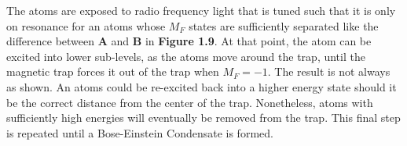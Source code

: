 The atoms are exposed to radio frequency light that is tuned such that it is only on resonance for an atoms whose $M_F$ states are sufficiently separated like the difference between \textbf{A} and \textbf{B} in \textbf{Figure 1.9}. At that point, the atom can be excited into lower sub-levels, as the atoms move around the trap, until the magnetic trap forces it out of the trap when $M_F=-1$. The result is not always as shown. An atoms could be re-excited back into a higher energy state should it be the correct distance from the center of the trap. Nonetheless, atoms with sufficiently high energies will eventually be removed from the trap. This final step is repeated until a Bose-Einstein Condensate is formed. 